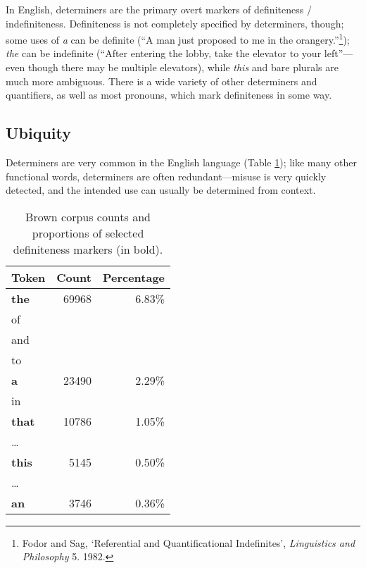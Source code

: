 \documentclass[11pt]{article}\usepackage{graphicx, color}
\begin{document}
In English, determiners are the primary overt markers of definiteness / indefiniteness.
Definiteness is not completely specified by determiners, though; some uses of \emph{a} can be definite (``A man just proposed to me in the orangery.''\footnote{Fodor and Sag, `Referential and Quantificational Indefinites', \emph{Linguistics and Philosophy} 5. 1982.}); \emph{the} can be indefinite (``After entering the lobby, take the elevator to your left''---even though there may be multiple elevators), while \emph{this} and bare plurals are much more ambiguous. There is a wide variety of other determiners and quantifiers, as well as most pronouns, which mark definiteness in some way.

\subsection{Ubiquity}
Determiners are very common in the English language (Table \ref{tab:browncounts}); like many other functional words, determiners are often redundant---misuse is very quickly detected, and the intended use can usually be determined from context.
\begin{table}
  \centering
  \begin{tabular}{lrr}
    Token & Count & Percentage\\
    \toprule
    \textbf{the} & 69968 & 6.83\% \\
    of & &\\%
    and & &\\%
    to & &\\%
    \textbf{a} & 23490 & 2.29\% \\
    in & &\\%
    \textbf{that} & 10786 & 1.05\% \\
    \dots &       &          \\
    \textbf{this} & 5145 & 0.50\% \\
    \dots &       &          \\
    \textbf{an} & 3746 & 0.36\% \\
  \end{tabular}
  \caption{Brown corpus counts and proportions of selected definiteness markers (in bold).}
  \label{tab:browncounts}
\end{table}
\end{document}
